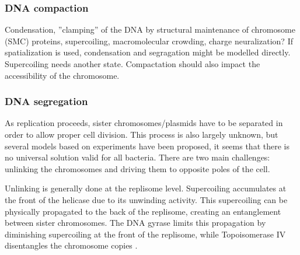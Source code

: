 \subsubsection{DNA compaction}
\textcolor[rgb]{1.00,0.00,0.00}{Condensation, ”clamping” of the DNA by structural maintenance of chromosome (SMC) proteins, supercoiling, macromolecular crowding, charge neuralization?}
If spatialization is used, condensation and segragation might be modelled directly. Supercoiling needs another state.
\textcolor[rgb]{1.00,0.00,0.00}{Compactation should also impact the accessibility of the chromosome.}

\subsubsection{DNA segregation}
As replication proceeds, sister chromosomes/plasmids have to be separated in order to allow proper cell division. This process is also largely unknown, but several models based on experiments have been proposed, it seems that there is no universal solution valid for all bacteria. There are two main challenges: unlinking the chromosomes and driving them to opposite poles of the cell.

Unlinking is generally done at the replisome level. Supercoiling accumulates at the front of the helicase due to its unwinding activity. This supercoiling can be physically propagated to the back of the replisome, creating an entanglement between sister chromosomes. The DNA gyrase limits this propagation by diminishing supercoiling at the front of the replisome, while Topoisomerase IV disentangles the chromosome copies \citep{reyes-lamothe_chromosome_2012}.

